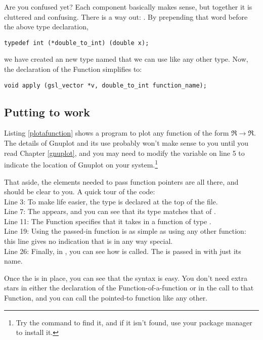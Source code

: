 Are you confused yet? Each component basically makes sense, but together
it is cluttered and confusing. There is a way out: . By prepending
that word before the above type declaration,
\begin{lstlisting}
typedef int (*double_to_int) (double x);
\end{lstlisting}
we have created an new type named  that we can
use like any other type. Now, the declaration of the  Function
simplifies to:
\begin{lstlisting}[emph={double_to_int,gsl_vector}]
void apply (gsl_vector *v, double_to_int function_name);
\end{lstlisting}

\subsection{Putting  to work}
Listing \ref{plotafunction} shows a program to plot any function of the
form $\Re\to\Re$. The
details of Gnuplot and its use probably won't make sense to you until
you read Chapter \ref{gnuplot}, and you may need to modify the
 variable on line 5 to indicate the location of Gnuplot on
your system.\footnote{Try the command  to find it,
and if it isn't found, use your package manager to install it.}

That aside, the elements needed to pass function pointers are all there,
and should be clear to you. A quick tour of the code:\\
Line 3: To make life easier, the  type is
declared at the top of the file. \\
Line 7: The  appears, and you can see that its type matches that of . \\
Line 11: The  Function specifies that it takes in a function of type
.\\
Line 19: Using the passed-in function is as simple
as using any other function: this line  gives no
indication that  is in any way special.  \\
Line 26: Finally, in ,
you can see how  is called. The 
is passed in with just its name.

Once the  is in place, you can see that the syntax is 
easy. You don't need extra stars in either the declaration of the
Function-of-a-function or in the call to that Function, and you can call
the pointed-to function like any other. 

